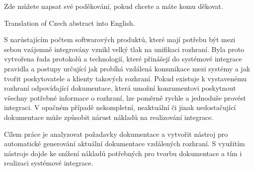 \documentclass[11pt,twoside,a4paper]{book}
\begin{document}

\coverpagestarts


\acknowledgements
\noindent
Zde můžete napsat své poděkování, pokud chcete a máte komu děkovat.





 
\abstractpage

Translation of Czech abstract into English.


\baselineskip
S narůstajícím počtem softwarových produktů, které mají potřebu být mezi sebou vzájemně
integrovány vznikl velký tlak na unifikaci rozhraní. Byla proto vytvořena řada protokolů a
technologií, které přinášejí do systémové integrace pravidla a postupy určující jak probíhá
vzdálená komunikace mezi systémy a jak tvořit poskytovatele a klienty takových rozhraní.
Pokud existuje k vystavenému rozhraní odpovídající dokumentace, která umožní
konzumentovi poskytnout všechny potřebné informace o rozhraní, lze poměrně rychle a
jednoduše provést integraci. V opačném případě nekompletní, neaktuální či jinak
nedostačující dokumentace může způsobit nárust nákladů na realizování integrace.

Cílem práce je analyzovat požadavky dokumentace a vytvořit nástroj pro automatické
generování aktuální dokumentace vzdálených rozhraní. S využitím nástroje dojde ke snížení
nákladů potřebných pro tvorbu dokumentace a tím i realizaci systémové integrace.



\tableofcontents
{} 



\listoffigures



\listoftables
\end{document}
